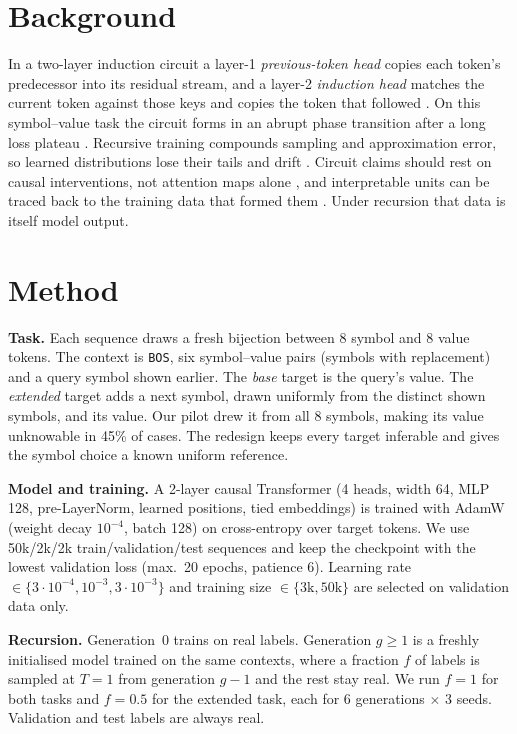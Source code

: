 \documentclass[10pt,a4paper]{article}
\begin{document}
\section{Background}
In a two-layer induction circuit a layer-1 \emph{previous-token head} copies each token's predecessor into its residual stream, and a layer-2 \emph{induction head} matches the current token against those keys and copies the token that followed \citep{olsson2022}. On this symbol--value task the circuit forms in an abrupt phase transition after a long loss plateau \citep{singh2024}. Recursive training compounds sampling and approximation error, so learned distributions lose their tails and drift \citep{shumailov2023,shumailov2024}. Circuit claims should rest on causal interventions, not attention maps alone \citep{conmy2023}, and interpretable units can be traced back to the training data that formed them \citep{chen2026}. Under recursion that data is itself model output.

\section{Method}
\textbf{Task.} Each sequence draws a fresh bijection between 8 symbol and 8 value tokens. The context is \texttt{BOS}, six symbol--value pairs (symbols with replacement) and a query symbol shown earlier. The \emph{base} target is the query's value. The \emph{extended} target adds a next symbol, drawn uniformly from the distinct shown symbols, and its value. Our pilot drew it from all 8 symbols, making its value unknowable in 45\% of cases. The redesign keeps every target inferable and gives the symbol choice a known uniform reference.

\textbf{Model and training.} A 2-layer causal Transformer (4 heads, width 64, MLP 128, pre-LayerNorm, learned positions, tied embeddings) is trained with AdamW (weight decay $10^{-4}$, batch 128) on cross-entropy over target tokens. We use 50k/2k/2k train/validation/test sequences and keep the checkpoint with the lowest validation loss (max.\ 20 epochs, patience 6). Learning rate $\in\{3{\cdot}10^{-4},10^{-3},3{\cdot}10^{-3}\}$ and training size $\in\{3\text{k},50\text{k}\}$ are selected on validation data only.

\textbf{Recursion.} Generation~0 trains on real labels. Generation $g{\geq}1$ is a freshly initialised model trained on the same contexts, where a fraction $f$ of labels is sampled at $T{=}1$ from generation $g{-}1$ and the rest stay real. We run $f{=}1$ for both tasks and $f{=}0.5$ for the extended task, each for 6 generations $\times$ 3 seeds. Validation and test labels are always real.
\end{document}
